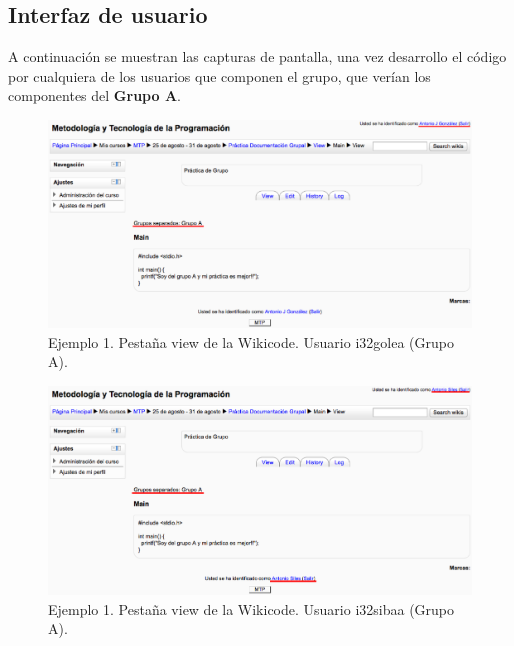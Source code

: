 \newpage

\subsection{Interfaz de usuario}

A continuación se muestran las capturas de pantalla, una vez desarrollo el código por cualquiera de los usuarios que componen el grupo, que verían los componentes del \textbf{Grupo A}.

\begin{center}

\begin{figure}[h]
	\label{fig:ej1view1}
	\includegraphics[scale=0.40]{./img/ej1view1.eps}
	\caption{Ejemplo 1. Pestaña view de la Wikicode. Usuario i32golea (Grupo A).}
\end{figure}

\begin{figure}[h]
	\label{fig:ej1view2}
	\includegraphics[scale=0.40]{./img/ej1view2.eps}
	\caption{Ejemplo 1. Pestaña view de la Wikicode. Usuario i32sibaa (Grupo A).}
\end{figure}

\end{center}

\newpage

